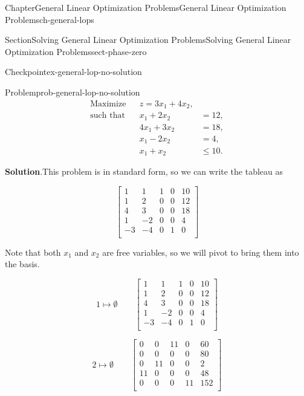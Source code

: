 \documentclass[oneside,10pt,]{book}
\newcommand{\blocktitlefont}{\relax}
\numberwithin{equation}{section}
\newcommand{\amp}{&}
\begin{document}
\begin{chapterptx}{Chapter}{General Linear Optimization Problems}{}{General Linear Optimization Problems}{}{}{ch-general-lops}
\begin{sectionptx}{Section}{Solving General Linear Optimization Problems}{}{Solving General Linear Optimization Problems}{}{}{sect-phase-zero}
\begin{inlineexercise}{Checkpoint}{}{ex-general-lop-no-solution}
\begin{problem}{Problem}{}{prob-general-lop-no-solution}
\begin{equation*}
\begin{aligned} \text{Maximize} \amp\amp z = 3x_1 + 4x_2, \amp \\ \text{such that} \amp\amp x_1 + 2x_2 \amp = 12, \\ \amp\amp 4x_1 + 3x_2 \amp = 18, \\ \amp \amp x_1 - 2x_2 \amp = 4, \\ \amp \amp x_1 + x_2 \amp \leq 10.
\end{aligned}
\end{equation*}
%
\par\smallskip%
\noindent\textbf{\blocktitlefont Solution}.\hypertarget{prob-general-lop-no-solution-2}{}\quad{}This problem is in standard form, so we can write the tableau as%
\par
%
\begin{equation*}
\left[\begin{array}{rr|rr|r} 1 \amp 1 \amp 1 \amp 0 \amp 10\\ 1 \amp 2 \amp 0 \amp 0 \amp 12\\ 4 \amp 3 \amp 0 \amp 0 \amp 18\\ 1 \amp -2 \amp 0 \amp 0 \amp 4\\ \hline -3 \amp -4 \amp 0 \amp 1 \amp 0\\ \end{array} \right]
\end{equation*}
%
\par
Note that both \(x_1\) and \(x_2\) are free variables, so we will pivot to bring them into the basis.%
\par
%
\begin{equation*}
1 \mapsto \emptyset \qquad \left[\begin{array}{rr|rr|r} 1 \amp 1 \amp 1 \amp 0 \amp 10\\ 1 \amp 2 \amp 0 \amp 0 \amp 12\\ 4 \amp 3 \amp 0 \amp 0 \amp 18\\ 1 \amp -2 \amp 0 \amp 0 \amp 4\\ \hline -3 \amp -4 \amp 0 \amp 1 \amp 0\\ \end{array} \right]
\end{equation*}
%
\par
%
\begin{equation*}
2 \mapsto \emptyset \qquad \left[\begin{array}{rr|rr|r} 0 \amp 0 \amp 11 \amp 0 \amp 60\\ 0 \amp 0 \amp 0 \amp 0 \amp 80\\ 0 \amp 11 \amp 0 \amp 0 \amp 2\\ 11 \amp 0 \amp 0 \amp 0 \amp 48\\ \hline 0 \amp 0 \amp 0 \amp 11 \amp 152\\ \end{array} \right]

\end{equation*}
\end{problem}
\end{inlineexercise}
\end{sectionptx}
\end{chapterptx}
\end{document}
